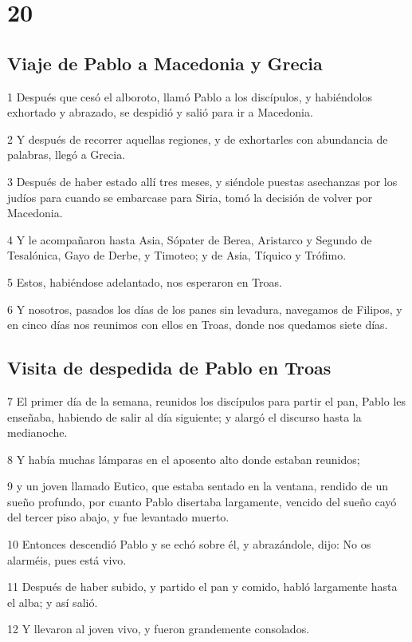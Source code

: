 \chapter{20}

\section*{Viaje de Pablo a Macedonia y Grecia}

\par 1 Después que cesó el alboroto, llamó Pablo a los discípulos, y habiéndolos exhortado y abrazado, se despidió y salió para ir a Macedonia.
\par 2 Y después de recorrer aquellas regiones, y de exhortarles con abundancia de palabras, llegó a Grecia.
\par 3 Después de haber estado allí tres meses, y siéndole puestas asechanzas por los judíos para cuando se embarcase para Siria, tomó la decisión de volver por Macedonia.
\par 4 Y le acompañaron hasta Asia, Sópater de Berea, Aristarco y Segundo de Tesalónica, Gayo de Derbe, y Timoteo; y de Asia, Tíquico y Trófimo.
\par 5 Estos, habiéndose adelantado, nos esperaron en Troas.
\par 6 Y nosotros, pasados los días de los panes sin levadura, navegamos de Filipos, y en cinco días nos reunimos con ellos en Troas, donde nos quedamos siete días.

\section*{Visita de despedida de Pablo en Troas}

\par 7 El primer día de la semana, reunidos los discípulos para partir el pan, Pablo les enseñaba, habiendo de salir al día siguiente; y alargó el discurso hasta la medianoche.
\par 8 Y había muchas lámparas en el aposento alto donde estaban reunidos;
\par 9 y un joven llamado Eutico, que estaba sentado en la ventana, rendido de un sueño profundo, por cuanto Pablo disertaba largamente, vencido del sueño cayó del tercer piso abajo, y fue levantado muerto.
\par 10 Entonces descendió Pablo y se echó sobre él, y abrazándole, dijo: No os alarméis, pues está vivo.
\par 11 Después de haber subido, y partido el pan y comido, habló largamente hasta el alba; y así salió.
\par 12 Y llevaron al joven vivo, y fueron grandemente consolados.

